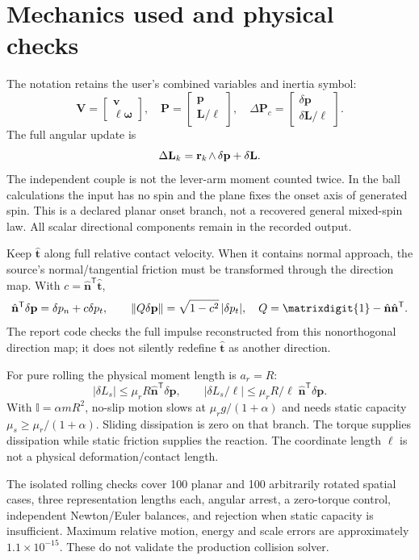 \documentclass[10pt,a4paper]{article}
\newcommand{\rw}[1]{\mathord{#1\mkern2mu\wedge}}
\newcommand{\inertia}{\mathbb I}
\newcommand{\id}{\matrixdigit{1}}
\begin{document}
\newpage
\section*{Mechanics used and physical checks}

The notation retains the user's combined variables and inertia symbol:
\[
 \mathbf V=\begin{bmatrix}\mathbf v\\\ell\boldsymbol\omega\end{bmatrix},\quad
 \mathbf P=\begin{bmatrix}\mathbf p\\\mathbf L/\ell\end{bmatrix},\quad
 \Delta\mathbf P_c=\begin{bmatrix}\delta\mathbf p\\\delta\mathbf L/\ell\end{bmatrix}.
\]
The full angular update is
\[
 \Delta\mathbf L_k=\rw{\mathbf r_k}\,\delta\mathbf p+\delta\mathbf L.
\]
The independent couple is not the lever-arm moment counted twice. In the ball
calculations the input has no spin and the plane fixes the onset axis of generated
spin. This is a declared planar onset branch, not a recovered general mixed-spin law.
All scalar directional components remain in the recorded output.

Keep $\hat{\mathbf t}$ along full relative contact velocity. When it contains normal
approach, the source's normal/tangential friction must be transformed through the
direction map. With $c=\hat{\mathbf n}^{\mathsf T}\hat{\mathbf t}$,
\[
 \hat{\mathbf n}^{\mathsf T}\delta\mathbf p=\delta p_n+c\delta p_t,\qquad
 \|Q\delta\mathbf p\|=\sqrt{1-c^2}\,|\delta p_t|,
 \quad Q=\id-\hat{\mathbf n}\hat{\mathbf n}^{\mathsf T}.
\]
The report code checks the full impulse reconstructed from this nonorthogonal
direction map; it does not silently redefine $\hat{\mathbf t}$ as another direction.

For pure rolling the physical moment length is $a_r=R$:
\[
 |\delta L_s|\le\mu_r R\hat{\mathbf n}^{\mathsf T}\delta\mathbf p,\qquad
 |\delta L_s/\ell|\le\mu_r R/\ell\;\hat{\mathbf n}^{\mathsf T}\delta\mathbf p.
\]
With $\inertia=\alpha mR^2$, no-slip motion slows at $\mu_r g/(1+\alpha)$ and needs
static capacity $\mu_s\ge\mu_r/(1+\alpha)$. Sliding dissipation is zero on that
branch. The torque supplies dissipation while static friction supplies the reaction.
The coordinate length $\ell$ is not a physical deformation/contact length.

The isolated rolling checks cover 100 planar and 100 arbitrarily rotated spatial
cases, three representation lengths each, angular arrest, a zero-torque control,
independent Newton/Euler balances, and rejection when static capacity is insufficient.
Maximum relative motion, energy and scale errors are approximately $1.1\times10^{-15}$.
These do not validate the production collision solver.
\end{document}
